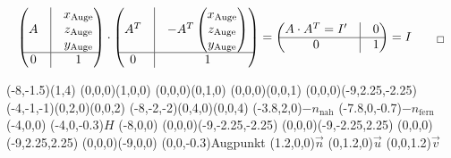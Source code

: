\begin{itemize}
\[\begin{pmatrix}
			A & \vrule & \begin{matrix}
				x_{\mathrm{Auge}} \\
				z_{\mathrm{Auge}} \\
				y_{\mathrm{Auge}}
			\end{matrix}\\
			\hline
			0 & \vrule & 1
		\end{pmatrix} \cdot
		\begin{pmatrix}
			A^T & \vrule & -A^T\begin{pmatrix}
				x_{\mathrm{Auge}} \\
				z_{\mathrm{Auge}} \\
				y_{\mathrm{Auge}}
			\end{pmatrix}\\
			\hline
			0 & \vrule & 1
		\end{pmatrix} =
		\begin{pmatrix}
			A \cdot A^T = I' & \vrule & 0\\
			\hline
			0 & \vrule & 1
		\end{pmatrix} = I\qquad_{\square}
	\]
	\begin{center}
	 \begin{pspicture}(-8,-1.5)(1,4)
	  \pstThreeDLine{->}(0,0,0)(1,0,0)
	  \pstThreeDLine{->}(0,0,0)(0,1,0)
	  \pstThreeDLine{->}(0,0,0)(0,0,1)
	  \pstThreeDLine(0,0,0)(-9,2.25,-2.25)
	  \pstThreeDSquare[fillstyle=vlines,hatchcolor=gray](-4,-1,-1)(0,2,0)(0,0,2)
	  \pstThreeDSquare[fillstyle=vlines,hatchcolor=gray](-8,-2,-2)(0,4,0)(0,0,4)
	  \pstThreeDPut(-3.8,2,0){$-n_{\mathrm{nah}}$}
	  \pstThreeDPut(-7.8,0,-0.7){$-n_{\mathrm{fern}}$}
	  \pstThreeDDot(-4,0,0)
	  \pstThreeDPut(-4,0,-0.3){$H$}
	  \pstThreeDDot(-8,0,0)
	  \pstThreeDLine(0,0,0)(-9,-2.25,-2.25)
	  \pstThreeDLine(0,0,0)(-9,-2.25,2.25)
	  \pstThreeDLine(0,0,0)(-9,2.25,2.25)
	  \pstThreeDLine(0,0,0)(-9,0,0)
	  \pstThreeDPut(0,0,-0.3){Augpunkt}
	  \pstThreeDPut(1.2,0,0){$\vec n$}
	  \pstThreeDPut(0,1.2,0){$\vec u$}
	  \pstThreeDPut(0,0,1.2){$\vec v$}


\end{pspicture}
\end{center}
\end{itemize}
